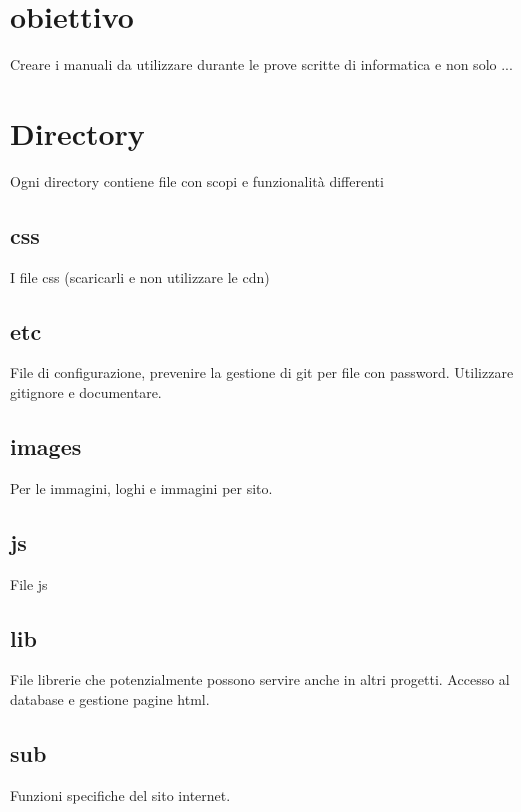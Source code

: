 \section*{obiettivo}

Creare i manuali da utilizzare durante le prove scritte di informatica e non solo ... \section*{Directory}

Ogni directory contiene file con scopi e funzionalità differenti

\subsection*{css}

I file css (scaricarli e non utilizzare le cdn)

\subsection*{etc}

File di configurazione, prevenire la gestione di git per file con password. Utilizzare gitignore e documentare.

\subsection*{images}

Per le immagini, loghi e immagini per sito.

\subsection*{js}

File js

\subsection*{lib}

File librerie che potenzialmente possono servire anche in altri progetti. Accesso al database e gestione pagine html.

\subsection*{sub}

Funzioni specifiche del sito internet. 